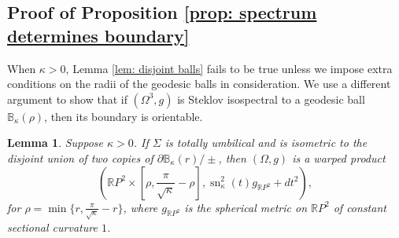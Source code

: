 \documentclass[11pt]{amsart}
\newcommand{\sn}{\operatorname{sn}}
\newtheorem{lemma}[theorem]{Lemma}
\theoremstyle{definition}
\numberwithin{equation}{section}
\begin{document}
\subsection{Proof of Proposition \ref{prop: spectrum determines boundary}}
When $\kappa>0$, Lemma \ref{lem: disjoint balls} fails to be true unless we impose extra conditions on the radii of the geodesic balls in consideration. We use a different argument to show that if $(\Omega^3,g)$ is Steklov isospectral to a geodesic ball $\mathbb B_\kappa(\rho)$, then its boundary is orientable.
\begin{lemma}\label{lem: spectrum implies orientability} 
   Suppose $\kappa > 0$. If $\Sigma$ is totally umbilical and is  isometric to the disjoint union of two copies of $\partial\mathbb B_\kappa(r)/\pm$,  then  $(\Omega,g)$ is a warped product
    \[\left(\mathbb RP^2\times \left[\rho,\frac{\pi}{\sqrt{\kappa}}-\rho\right], \sn_\kappa^2(t)g_{\mathbb RP^2} + dt^2\right),\]
    for $\rho=\min\{r, \frac{\pi}{\sqrt{\kappa}}-r\}$, where $g_{\mathbb RP^2}$ is the spherical metric on $\mathbb RP^2$ of constant sectional curvature $1$.
\end{lemma}
\end{document}
